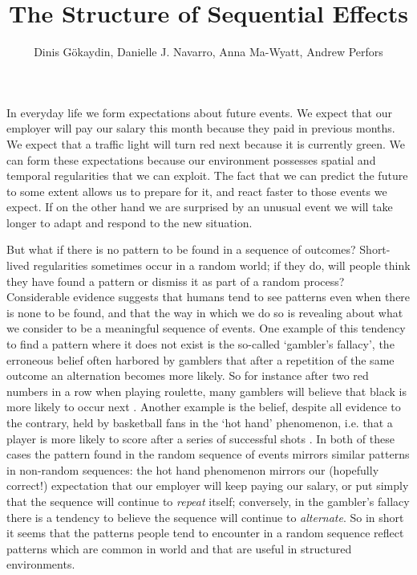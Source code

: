 \documentclass{apa}[12pt]
\title{The Structure of Sequential Effects}
\author{\normalsize Dinis G\"okaydin, Danielle J. Navarro, Anna Ma-Wyatt, Andrew Perfors}
\affiliation{School of Psychology\\University of Adelaide}
\begin{document}
\maketitle
\newpage

In everyday life we form expectations about future events. We expect that our employer will pay our salary this month because they paid in previous months. We expect that a traffic light will turn red next because it is currently green. We can form these expectations because our environment possesses spatial and temporal regularities that we can exploit. The fact that we can predict the future to some extent allows us to prepare for it, and react faster to those events we expect. If on the other hand we are surprised by an unusual event we will take longer to adapt and respond to the new situation.

But what if there is no pattern to be found in a sequence of outcomes? Short-lived regularities sometimes occur in a random world; if they do, will people think they have found a pattern or dismiss it as part of a random process? Considerable evidence suggests that humans tend to see patterns even when there is none to be found, and that the way in which we do so is revealing about what we consider to be a meaningful sequence of events. One example of this tendency to find a pattern where it does not exist is the so-called `gambler's fallacy', the erroneous belief often harbored by gamblers that after a repetition of the same outcome an alternation becomes more likely. So for instance after two red numbers in a row when playing roulette, many gamblers will believe that black is more likely to occur next \cite{Nickerson02}. Another example is the belief, despite all evidence to the contrary, held by basketball fans in the `hot hand' phenomenon, i.e. that a player is more likely to score after a series of successful shots \cite{Gilovich85}. In both of these cases the pattern found in the random sequence of events mirrors similar patterns in non-random sequences: the hot hand phenomenon mirrors our (hopefully correct!) expectation that our employer will keep paying our salary, or put simply that the sequence will continue to \textit{repeat} itself; conversely, in the gambler's fallacy there is a tendency to believe the sequence will continue to \textit{alternate}. So in short it seems that the patterns people tend to encounter in a random sequence reflect patterns which are common in world and that are useful in structured environments.
\end{document}
